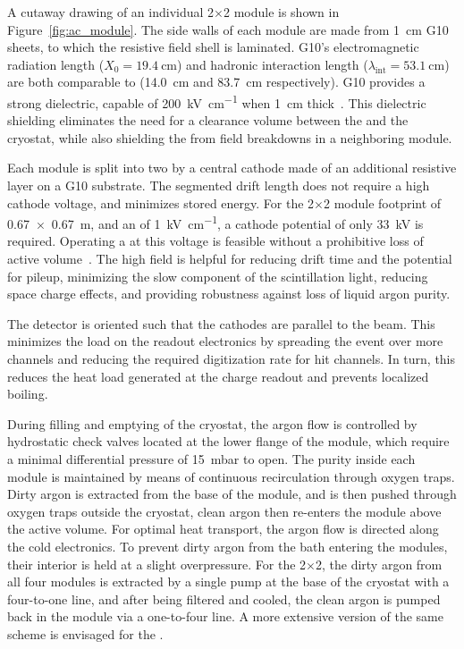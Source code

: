 A cutaway drawing of an individual 2$\times$2 module is shown in Figure~\ref{fig:ac_module}. The side walls of each module are made from \SI{1}{\centi\metre} G10 sheets, to which the resistive field shell is laminated. G10's electromagnetic radiation length ($X_{\mathrm{0}} = \SI{19.4}{\centi\metre}$) and hadronic interaction length ($\lambda_{\mathrm{int}} = \SI{53.1}{\centi\metre}$)~\cite{Tanabashi:2018oca} %
are both comparable to  (14.0~cm and 83.7~cm respectively).
G10 provides a strong dielectric, capable of \SI{200}{\kilo\volt\per\centi\metre} when \SI{1}{\centi\metre} thick~\cite{G10Breakdown}. This dielectric shielding eliminates the need for a clearance volume between the  and the cryostat, while also shielding the  from field breakdowns in a neighboring module. 

Each module is split into two  by a central cathode made of an additional resistive layer on a G10 substrate. The segmented drift length does not require a high cathode voltage, and minimizes stored energy. For the 2$\times$2 module footprint of \SI{0.67 x 0.67}{\metre}, and an \efield of \SI{1}{\kilo\volt\per\centi\metre}, a cathode potential of only \SI{33}{\kilo\volt} is required. Operating a  at this voltage is feasible without a prohibitive loss of active volume~\cite{Zeller:2013sva}.  The high field is helpful for reducing drift time and the potential for pileup, minimizing the slow component of the scintillation light, reducing space charge effects, and providing robustness against loss of liquid argon purity.  

The detector is oriented such that the cathodes are parallel to the beam. This minimizes the load on the readout electronics by spreading the event over more channels and reducing the required digitization rate for hit channels. In turn, this reduces the heat load generated at the charge readout and prevents localized boiling.

During filling and emptying of the cryostat, the argon flow is controlled by hydrostatic check valves located at the lower flange of the module, which require a minimal differential pressure of \SI{15}{\milli\bar} to open. The purity inside each module is maintained by means of continuous  recirculation through oxygen traps. Dirty argon is extracted from the base of the module, and is then pushed through oxygen traps outside the cryostat, clean argon then re-enters the module above the active volume. For optimal heat transport, the argon flow is directed along the cold electronics. To prevent dirty argon from the bath entering the modules, their interior is held at a slight overpressure. For the 2$\times$2, the dirty argon from all four modules is extracted by a single pump at the base of the cryostat with a four-to-one line, and after being filtered and cooled, the clean argon is pumped back in the module via a one-to-four line.
A more extensive version of the same scheme is envisaged for the  .  


